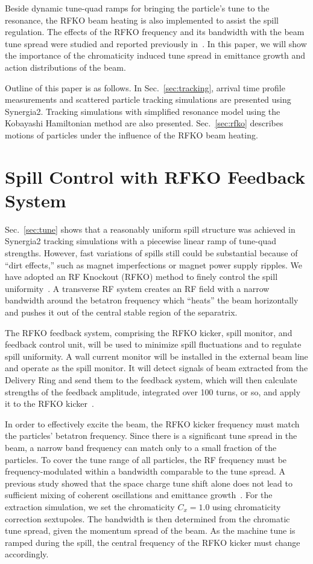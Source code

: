 \documentclass[review,1p,number,fleqn,a4paper]{elsarticle}
\begin{document}
Beside dynamic tune-quad ramps for bringing the particle's tune to the resonance, the RFKO beam heating is also implemented to assist the spill regulation. The effects of the RFKO frequency and its bandwidth with the beam tune spread were studied and reported previously in~\cite{ipac11}. In this paper, we will show the importance of the chromaticity induced tune spread in emittance growth and action distributions of the beam.

Outline of this paper is as follows. In Sec.~\ref{sec:tracking}, arrival time profile measurements and scattered particle tracking simulations are presented using Synergia2. Tracking simulations with simplified resonance model using the Kobayashi Hamiltonian method are also presented. Sec.~\ref{sec:rfko} describes motions of particles under the influence of the RFKO beam heating.


\section{\label{sec:rfko1}Spill Control with RFKO Feedback System}

Sec.~\ref{sec:tune} shows that a reasonably uniform spill structure was achieved in Synergia2 tracking simulations with a piecewise linear ramp of tune-quad strengths. However, fast variations of spills still could be substantial because of ``dirt effects,'' such as magnet imperfections or magnet power supply ripples. We have adopted an RF Knockout (RFKO) method to finely control the spill uniformity~\cite{HB10}. A transverse RF system creates an RF field with a narrow bandwidth around the betatron frequency which ``heats'' the beam horizontally and pushes it out of the central stable region of the separatrix.

The RFKO feedback system, comprising the RFKO kicker, spill monitor, and feedback control unit, will be used to minimize spill fluctuations and to regulate spill uniformity. A wall current monitor will be installed in the external beam line and operate as the spill monitor. It will detect signals of beam extracted from the Delivery Ring and send them to the feedback system, which will then calculate strengths of the feedback amplitude, integrated over 100 turns, or so, and apply it to the RFKO kicker~\cite{wcm}.

In order to effectively excite the beam, the RFKO kicker frequency must match the particles' betatron frequency. Since there is a significant tune spread in the beam, a narrow band frequency can match only to a small fraction of the particles. To cover the tune range of all particles, the RF frequency must be frequency-modulated within a bandwidth comparable to the tune spread. A previous study showed that the space charge tune shift alone does not lead to sufficient mixing of coherent oscillations and emittance growth~\cite{HB10}.  For the extraction simulation, we set the chromaticity \mbox{$C_{x} = 1.0$} using chromaticity correction sextupoles. The bandwidth is then determined from the chromatic tune spread, given the momentum spread of the beam. As the machine tune is ramped during the spill, the central frequency of the RFKO kicker must change accordingly.
\end{document}
